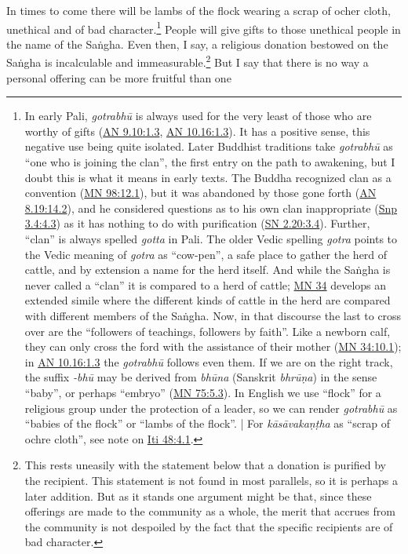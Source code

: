 \documentclass[12pt,openany]{book}%
\begin{document}
In times to come there will be lambs of the flock wearing a scrap of ocher cloth, unethical and of bad character.\footnote{In early Pali, \textit{\textsanskrit{gotrabhū}} is always used for the very least of those who are worthy of gifts (\href{https://suttacentral.net/an9.10/en/sujato\#1.3}{AN 9.10:1.3}, \href{https://suttacentral.net/an10.16/en/sujato\#1.3}{AN 10.16:1.3}). It has a positive sense, this negative use being quite isolated. Later Buddhist traditions take \textit{\textsanskrit{gotrabhū}} as “one who is joining the clan”, the first entry on the path to awakening, but I doubt this is what it means in early texts. The Buddha recognized clan as a convention (\href{https://suttacentral.net/mn98/en/sujato\#12.1}{MN 98:12.1}), but it was abandoned by those gone forth (\href{https://suttacentral.net/an8.19/en/sujato\#14.2}{AN 8.19:14.2}), and he considered questions as to his own clan inappropriate (\href{https://suttacentral.net/snp3.4/en/sujato\#4.3}{Snp 3.4:4.3}) as it has nothing to do with purification (\href{https://suttacentral.net/sn2.20/en/sujato\#3.4}{SN 2.20:3.4}). Further, “clan” is always spelled \textit{gotta} in Pali. The older Vedic  spelling \textit{gotra} points to the Vedic meaning of \textit{gotra} as “cow-pen”, a safe place to gather the herd of cattle, and by extension a name for the herd itself. And while the \textsanskrit{Saṅgha} is never called a “clan” it is compared to a herd of cattle; \href{https://suttacentral.net/mn34/en/sujato}{MN 34} develops an extended simile where the different kinds of cattle in the herd are compared with different members of the \textsanskrit{Saṅgha}. Now, in that discourse the last to cross over are the “followers of teachings, followers by faith”. Like a newborn calf, they can only cross the ford with the assistance of their mother (\href{https://suttacentral.net/mn34/en/sujato\#10.1}{MN 34:10.1}); in \href{https://suttacentral.net/an10.16/en/sujato\#1.3}{AN 10.16:1.3} the \textit{\textsanskrit{gotrabhū}} follows even them. If we are on the right track, the suffix \textit{-\textsanskrit{bhū}} may be derived from \textit{\textsanskrit{bhūna}} (Sanskrit \textit{\textsanskrit{bhrūṇa}}) in the sense “baby”, or perhaps “embryo” (\href{https://suttacentral.net/mn75/en/sujato\#5.3}{MN 75:5.3}). In English we use “flock” for a religious group under the protection of a leader, so we can render \textit{\textsanskrit{gotrabhū}} as “babies of the flock” or “lambs of the flock”. | For \textit{\textsanskrit{kāsāvakaṇṭha}} as “scrap of ochre cloth”, see note on \href{https://suttacentral.net/iti48/en/sujato\#4.1}{Iti 48:4.1}. } People will give gifts to those unethical people in the name of the \textsanskrit{Saṅgha}. Even then, I say, a religious donation bestowed on the \textsanskrit{Saṅgha} is incalculable and immeasurable.\footnote{This rests uneasily with the statement below that a donation is purified by the recipient. This statement is not found in most parallels, so it is perhaps a later addition. But as it stands one argument might be that, since these offerings are made to the community as a whole, the merit that accrues from the community is not despoiled by the fact that the specific recipients are of bad character. } But I say that there is no way a personal offering can be more fruitful than one 
\end{document}
